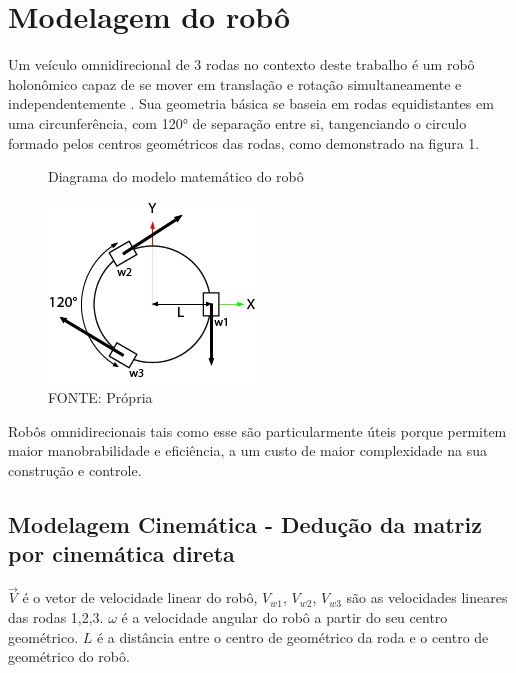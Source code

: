 
\section{Modelagem do robô}

Um veículo omnidirecional de 3 rodas no contexto deste trabalho é um robô
holonômico capaz de se mover em translação e rotação simultaneamente e
independentemente \cite{mobile_manipulator_robot}. Sua geometria básica se 
baseia em rodas equidistantes em uma circunferência, com 120° de separação entre
si, tangenciando o circulo formado pelos centros geométricos das rodas, como demonstrado na figura
1.

\begin{figure}[ht]
	\centering
	\caption{Diagrama do modelo matemático do robô}
	\includegraphics{figures/model}
	\caption*{FONTE: Própria}
\end{figure}

Robôs omnidirecionais tais como esse são particularmente úteis porque permitem
 maior manobrabilidade e eficiência, a um custo de maior complexidade na sua
 construção e controle. \cite{dynamical_models_for_omni_directional_robots}

\subsection{Modelagem Cinemática - Dedução da matriz por cinemática direta}

$\overrightarrow{V}$ é o vetor de velocidade linear do robô, $V_{w1}$, $V_{w2}$,
$V_{w3}$ são as velocidades lineares das rodas 1,2,3. 
$\omega $ é a velocidade angular do robô a partir do seu centro geométrico.
$L$ é a distância entre o centro de geométrico da roda e o centro de geométrico
do robô.


